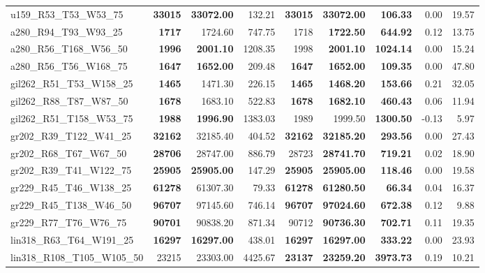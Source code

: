 \documentclass{singlecol-new}
\begin{document}
{\begin{longtable}{lrrrrrrrr}
		u159\_R53\_T53\_W53\_75 & \textbf{33015} & \textbf{33072.00} & 132.21 & \textbf{33015} & \textbf{33072.00} & \textbf{106.33} & 0.00 & 19.57 \\
		a280\_R94\_T93\_W93\_25 & \textbf{1717} & 1724.60 & 747.75 & 1718 & \textbf{1722.50} & \textbf{644.92} & 0.12 & 13.75 \\
		a280\_R56\_T168\_W56\_50 & \textbf{1996} & \textbf{2001.10} & 1208.35 & 1998 & \textbf{2001.10} & \textbf{1024.14} & 0.00 & 15.24 \\
		a280\_R56\_T56\_W168\_75 & \textbf{1647} & \textbf{1652.00} & 209.48 & \textbf{1647} & \textbf{1652.00} & \textbf{109.35} & 0.00 & 47.80 \\
		gil262\_R51\_T53\_W158\_25 & \textbf{1465} & 1471.30 & 226.15 & \textbf{1465} & \textbf{1468.20} & \textbf{153.66} & 0.21 & 32.05 \\
		gil262\_R88\_T87\_W87\_50 & \textbf{1678} & 1683.10 & 522.83 & \textbf{1678} & \textbf{1682.10} & \textbf{460.43} & 0.06 & 11.94 \\
		gil262\_R51\_T158\_W53\_75 & \textbf{1988} & \textbf{1996.90} & 1383.03 & 1989 & 1999.50 & \textbf{1300.50} & -0.13 & 5.97 \\
		gr202\_R39\_T122\_W41\_25 & \textbf{32162} & 32185.40 & 404.52 & \textbf{32162} & \textbf{32185.20} & \textbf{293.56} & 0.00 & 27.43 \\
		gr202\_R68\_T67\_W67\_50 & \textbf{28706} & 28747.00 & 886.79 & 28723 & \textbf{28741.70} & \textbf{719.21} & 0.02 & 18.90 \\
		gr202\_R39\_T41\_W122\_75 & \textbf{25905} & \textbf{25905.00} & 147.29 & \textbf{25905} & \textbf{25905.00} & \textbf{118.46} & 0.00 & 19.58 \\
		gr229\_R45\_T46\_W138\_25 & \textbf{61278} & 61307.30 & 79.33 & \textbf{61278} & \textbf{61280.50} & \textbf{66.34} & 0.04 & 16.37 \\
		gr229\_R45\_T138\_W46\_50 & \textbf{96707} & 97145.60 & 746.14 & \textbf{96707} & \textbf{97024.60} & \textbf{672.38} & 0.12 & 9.88 \\
		gr229\_R77\_T76\_W76\_75 & \textbf{90701} & 90838.20 & 871.34 & 90712 & \textbf{90736.30} & \textbf{702.71} & 0.11 & 19.35 \\
		lin318\_R63\_T64\_W191\_25 & \textbf{16297} & \textbf{16297.00} & 438.01 & \textbf{16297} & \textbf{16297.00} & \textbf{333.22} & 0.00 & 23.93 \\
		lin318\_R108\_T105\_W105\_50 & 23215 & 23303.00 & 4425.67 & \textbf{23137} & \textbf{23259.20} & \textbf{3973.73} & 0.19 & 10.21 \\

\end{longtable}}
\end{document}
